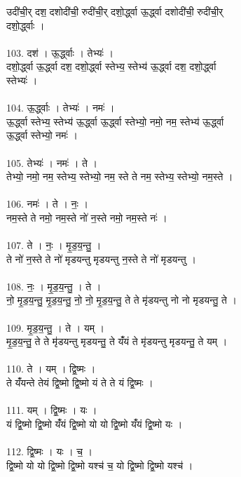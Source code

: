 उदी॑ची॒र् दश॒ दशोदी॑ची॒ रुदी॑ची॒र् दशो॒र्द्ध्वा ऊ॒र्द्ध्वा दशोदी॑ची॒ रुदी॑ची॒र्\\
दशो॒र्द्ध्वाः ।\\
\\
103. दश॑ । ऊ॒र्द्ध्वाः । तेभ्यः॑ ।\\
दशो॒र्द्ध्वा ऊ॒र्द्ध्वा दश॒ दशो॒र्द्ध्वा स्तेभ्य॒ स्तेभ्य॑ ऊ॒र्द्ध्वा दश॒ दशो॒र्द्ध्वा\\
स्तेभ्यः॑ ।\\
\\
104. ऊ॒र्द्ध्वाः । तेभ्यः॑ । नमः॑ ।\\
ऊ॒र्द्ध्वा स्तेभ्य॒ स्तेभ्य॑ ऊ॒र्द्ध्वा ऊ॒र्द्ध्वा स्तेभ्यो॒ नमो॒ नम॒ स्तेभ्य॑ ऊ॒र्द्ध्वा\\
ऊ॒र्द्ध्वा स्तेभ्यो॒ नमः॑ ।\\
\\
105. तेभ्यः॑ । नमः॑ । ते ।\\
तेभ्यो॒ नमो॒ नम॒ स्तेभ्य॒ स्तेभ्यो॒ नम॒ स्ते ते नम॒ स्तेभ्य॒ स्तेभ्यो॒ नम॒स्ते ।\\
\\
106. नमः॑ । ते । नः॒ ।\\
नम॒स्ते ते नमो॒ नम॒स्ते नो॑ न॒स्ते नमो॒ नम॒स्ते नः॑ ।\\
\\
107. ते । नः॒ । मृ॒ड॒य॒न्तु॒ ।\\
ते नो॑ न॒स्ते ते नो॑ मृडयन्तु मृडयन्तु न॒स्ते ते नो॑ मृडयन्तु ।\\
\\
108. नः॒ । मृ॒ड॒य॒न्तु॒ । ते ।\\
नो॒ मृ॒ड॒य॒न्तु॒ मृ॒ड॒य॒न्तु॒ नो॒ नो॒ मृ॒ड॒य॒न्तु॒ ते ते मृ॑डयन्तु नो नो मृडयन्तु॒ ते ।\\
\\
109. मृ॒ड॒य॒न्तु॒ । ते । यम् ।\\
मृ॒ड॒य॒न्तु॒ ते ते मृ॑डयन्तु मृडयन्तु॒ ते यंँयं ते मृ॑डयन्तु मृडयन्तु॒ ते यम् ।\\
\\
110. ते । यम् । द्वि॒ष्मः ।\\
ते यंँयन्ते तेयं द्वि॒ष्मो द्वि॒ष्मो यं ते ते यं द्वि॒ष्मः ।\\
\\
111. यम् । द्वि॒ष्मः । यः ।\\
यं द्वि॒ष्मो द्वि॒ष्मो यंँयं द्वि॒ष्मो यो यो द्वि॒ष्मो यंँयं द्वि॒ष्मो यः ।\\
\\
112. द्वि॒ष्मः । यः । च॒ ।\\
द्वि॒ष्मो यो यो द्वि॒ष्मो द्वि॒ष्मो यश्च॑ च॒ यो द्वि॒ष्मो द्वि॒ष्मो यश्च॑ ।\\
